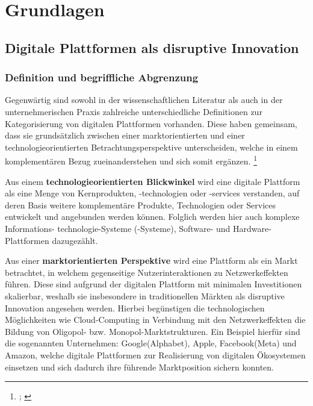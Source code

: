 \chapter{Grundlagen}

\section{Digitale Plattformen als disruptive Innovation}

\subsection{Definition und begriffliche Abgrenzung}

Gegenwärtig sind sowohl in der wissenschaftlichen Literatur als auch in der unternehmerischen Praxis zahlreiche unterschiedliche Definitionen zur Kategorisierung von digitalen Plattformen vorhanden. Diese haben gemeinsam, dass sie grundsätzlich zwischen einer marktorientierten und einer technologieorientierten Betrachtungsperspektive unterscheiden, welche in einem komplementären Bezug zueinanderstehen und sich somit ergänzen. \footnote{\cites[Vgl.][S. 21-23]{ENGELS2017}; \cites[Vgl.][S.99]{MEINHARDT2019}}



Aus einem \textbf{technologieorientierten Blickwinkel} wird eine digitale Plattform als eine Menge von Kernprodukten, -technologien oder -services verstanden, auf deren Basis weitere komplementäre Produkte, Technologien oder Services entwickelt und angebunden werden können.\autocite[Vgl.][S. 21]{ENGELS2017} Folglich werden hier auch komplexe Informations- technologie-Systeme (-Systeme), Software- und Hardware-Plattformen dazugezählt.\autocite[Vgl.][S.222f]{WEINREICH2016}

Aus einer \textbf{marktorientierten Perspektive} wird eine Plattform als ein Markt betrachtet, in welchem gegenseitige Nutzerinteraktionen zu Netzwerkeffekten führen. \autocite[Vgl.][S. 1273f]{EISENMANN2011} Diese sind aufgrund der digitalen Plattform mit minimalen Investitionen skalierbar, weshalb sie insbesondere in traditionellen Märkten als disruptive Innovation angesehen werden. \autocite[Vgl.][S. 17ff]{MOAZED2016} Hierbei begünstigen die technologischen Möglichkeiten wie Cloud-Computing in Verbindung mit den Netzwerkeffekten die Bildung von Oligopol- bzw. Monopol-Marktstrukturen.\autocite[Vgl.][S. 23]{ENGELS2017} Ein Beispiel hierfür sind die sogenannten  Unternehmen: Google(Alphabet), Apple, Facebook(Meta) und Amazon, welche digitale Plattformen zur Realisierung von digitalen Ökosystemen einsetzen und sich dadurch ihre führende Marktposition sichern konnten. \autocite[Vgl.][S. 92f]{BUNTE2020} 

